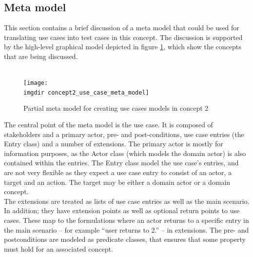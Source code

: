 \subsection{Meta model}
This section contains a brief discussion of a meta model that could be used for translating use cases into test cases in this concept. The discussion is supported by the high-level graphical model depicted in figure \ref{fig:concept2_use_case_meta_model}, which show the concepts that are being discussed.\\\\
\begin{figure}[h]
  \centering
  \texttt{[image: \\imgdir concept2\_use\_case\_meta\_model]}
  \caption{Partial meta model for creating use cases models in concept 2}
  \label{fig:concept2_use_case_meta_model}
\end{figure}The central point of the meta model is the use case. It is composed of stakeholders and a primary actor, pre- and post-conditions, use case entries (the Entry class) and a number of extensions. The primary actor is mostly for information purposes, as the Actor class (which models the domain actor) is also contained within the entries. The Entry class model the use case's entries, and are not very flexible as they expect a use case entry to consist of an actor, a target and an action. The target may be either a domain actor or a domain concept.\\
The extensions are treated as lists of use case entries as well as the main scenario. In addition; they have extension points as well as optional return points to use cases. These map to the formulations where an actor returns to a specific entry in the main scenario -- for example ``user returns to 2.'' -- in extensions. The pre- and postconditions are modeled as predicate classes, that ensures that some property must hold for an associated concept.

